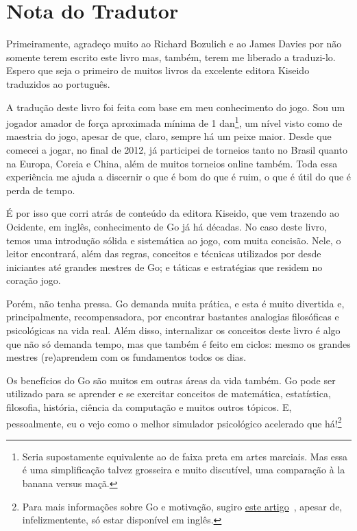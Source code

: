 \chapter{Nota do Tradutor}

Primeiramente, agradeço muito ao Richard Bozulich e ao James Davies por não somente terem escrito este livro mas, também, terem me liberado a traduzi-lo. Espero que seja o primeiro de muitos livros da excelente editora Kiseido~\cite{kiseido} traduzidos ao português.

\bigskip
\bigskip

A tradução deste livro foi feita com base em meu conhecimento do jogo. Sou um jogador amador de força aproximada mínima de 1 dan\footnote{Seria supostamente equivalente ao de faixa preta em artes marciais. Mas essa é uma simplificação talvez grosseira e muito discutível, uma comparação à la banana versus maçã.}, um nível visto como de maestria do jogo, apesar de que, claro, sempre há um peixe maior. Desde que comecei a jogar, no final de 2012, já participei de torneios tanto no Brasil quanto na Europa, Coreia e China, além de muitos torneios online também. Toda essa experiência me ajuda a discernir o que é bom do que é ruim, o que é útil do que é perda de tempo.

É por isso que corri atrás de conteúdo da editora Kiseido, que vem trazendo ao Ocidente, em inglês, conhecimento de Go já há décadas. No caso deste livro, temos uma introdução sólida e sistemática ao jogo, com muita concisão. Nele, o leitor encontrará, além das regras, conceitos e técnicas utilizados por desde iniciantes até grandes mestres de Go; e táticas e estratégias que residem no coração jogo.

Porém, não tenha pressa. Go demanda muita prática, e esta é muito divertida e, principalmente, recompensadora, por encontrar bastantes analogias filosóficas e psicológicas na vida real. Além disso, internalizar os conceitos deste livro é algo que não só demanda tempo, mas que também é feito em ciclos: mesmo os grandes mestres (re)aprendem com os fundamentos todos os dias.

Os benefícios do Go são muitos em outras áreas da vida também. Go pode ser utilizado para se aprender e se exercitar conceitos de matemática, estatística, filosofia, história, ciência da computação e muitos outros tópicos. E, pessoalmente, eu o vejo como o melhor simulador psicológico acelerado que há!\footnote{Para mais informações sobre Go e motivação, sugiro \href{https://fanaro.io/articles/why_play_go/why_play_go.html}{este artigo}~\cite{why_play_go}, apesar de, infelizmentente, só estar disponível em inglês.}

